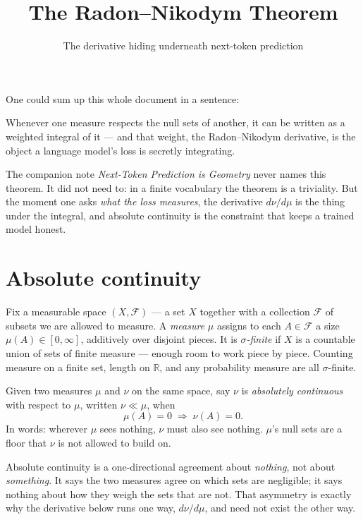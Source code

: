 \documentclass[11pt]{article}
\title{\color{inkblue}\bfseries The Radon--Nikodym Theorem}
\author{The derivative hiding underneath next-token prediction}
\date{}
\begin{document}
\maketitle
\thispagestyle{empty}

One could sum up this whole document in a sentence:
\begin{tcolorbox}[colback=yellow!18, colframe=yellow!55!black, arc=2pt, boxrule=0.5pt,
  left=10pt, right=10pt, top=8pt, bottom=8pt]
Whenever one measure respects the null sets of another, it can be written as a weighted
integral of it --- and that weight, the Radon--Nikodym derivative, is the object a language
model's loss is secretly integrating.
\end{tcolorbox}
The companion note \emph{Next-Token Prediction is Geometry} never names this theorem. It did
not need to: in a finite vocabulary the theorem is a triviality. But the moment one asks
\emph{what the loss measures}, the derivative $d\nu/d\mu$ is the thing under the integral,
and absolute continuity is the constraint that keeps a trained model honest.

\section{Absolute continuity}

Fix a measurable space $(X, \mathcal{F})$ --- a set $X$ together with a collection
$\mathcal{F}$ of subsets we are allowed to measure. A \emph{measure} $\mu$ assigns to each
$A \in \mathcal{F}$ a size $\mu(A) \in [0, \infty]$, additively over disjoint pieces. It is
\emph{$\sigma$-finite} if $X$ is a countable union of sets of finite measure --- enough room
to work piece by piece. Counting measure on a finite set, length on $\mathbb{R}$, and any
probability measure are all $\sigma$-finite.

Given two measures $\mu$ and $\nu$ on the same space, say $\nu$ is \emph{absolutely
continuous} with respect to $\mu$, written $\nu \ll \mu$, when
\[
  \mu(A) = 0 \;\Longrightarrow\; \nu(A) = 0 .
\]
In words: wherever $\mu$ sees nothing, $\nu$ must also see nothing. $\mu$'s null sets are a
floor that $\nu$ is not allowed to build on.

\begin{insight}
Absolute continuity is a one-directional agreement about \emph{nothing}, not about
\emph{something}. It says the two measures agree on which sets are negligible; it says
nothing about how they weigh the sets that are not. That asymmetry is exactly why the
derivative below runs one way, $d\nu/d\mu$, and need not exist the other way.
\end{insight}
\end{document}

